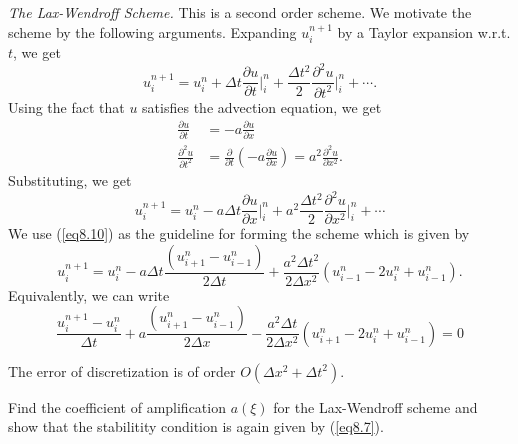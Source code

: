 \begin{exam}\label{chap8:exam8.4}
{\em The Lax-Wendroff Scheme.} This is a second order scheme. We
motivate the scheme by the following arguments. Expanding $u^{n+1}_i$
by a Taylor expansion w.r.t. $t$, we get  
\begin{equation*}
  u^{n+1}_i = u^n_i + \Delta t \frac{\partial u}{\partial t} \big|^n_i +
  \frac{\Delta t^2}{2} \frac{\partial^2 u}{\partial t^2} \big|^n_i +
  \cdots .\tag{8.9}\label{eq8.9} 
\end{equation*}
Using the fact that $u$ satisfies the advection equation, we get 
\begin{align*}
\frac{\partial u }{\partial t} & = - a \frac{\partial u}{\partial x}\\
\frac{\partial^2 u}{\partial t^2} & = \frac{\partial}{\partial t } \left(-a
\frac{\partial u}{\partial x}\right) = a^2 \frac{\partial^2 u}{\partial
  x^2}. 
\end{align*}
Substituting, we get
\begin{equation*}
u^{n+1}_i = u^n_i  - a \Delta t \frac{\partial u}{\partial x}
\big|^n_i + a^2 \frac{\Delta t^2}{2} \frac{\partial^2 u}{\partial x^2}
\big|^n_i + \cdots  
\tag{8.10}\label{eq8.10} 
\end{equation*}\pageoriginale
We use (\ref{eq8.10}) as the guideline for forming the scheme which is given by 
$$
u^{n+1}_i = u^n_i - a \Delta t \frac{(u^n_{i+1} - u^n_{i-1})}{2\Delta
  t} + \frac{a^2 \Delta t^2}{2\Delta x^2} (u^n_{i-1} - 2u^n_i +
u^n_{i-1}).  
$$
Equivalently, we can write 
\begin{equation*}
\frac{u^{n+1}_i - u^n_i}{\Delta t} + a \frac{(u^n_{i+1} -
  u^n_{i-1})}{2\Delta x}  - \frac{a^2 \Delta t}{2\Delta x^2}
(u^n_{i+1} - 2u^n_i + u^n_{i-1}) = 0 
\tag{8.11}\label{eq8.11}
\end{equation*}

The error of discretization is of order $O(\Delta x^2 + \Delta t^2)$. 
\end{exam}

\begin{exercise}\label{chap8:exer8.2}
Find the coefficient of amplification $a(\xi)$ for the Lax-Wen\-droff
scheme and show that the stabilitity condition is again given by
(\ref{eq8.7}). 
\end{exercise}

